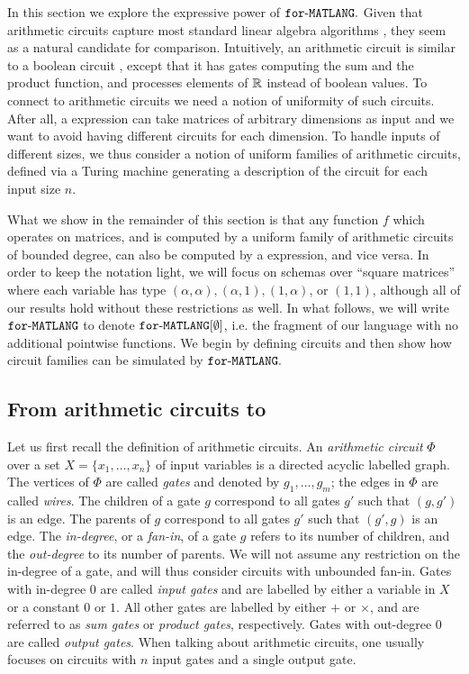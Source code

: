 In this section we explore the expressive power of $\texttt{for}\text{-}\texttt{MATLANG}.$ Given that arithmetic circuits \cite{allender} capture most standard linear algebra algorithms \cite{Raz02,ShpilkaY10}, they seem as a natural candidate for comparison. Intuitively, an arithmetic circuit is similar to a boolean circuit \cite{aroraB2009}, except that it has gates computing the sum and the product function, and processes elements of $\mathbb{R}$ instead of boolean values. To connect \langfor to arithmetic circuits we need a notion of uniformity of such circuits. After all, a \langfor expression can take matrices of arbitrary dimensions as input and we want to avoid having  different circuits for each dimension. To handle inputs of different sizes, we thus consider a notion of uniform families of arithmetic circuits, defined via a Turing machine generating a description of the circuit for each input size $n$.

What we show in the remainder of this section is that any function $f$ which operates on matrices, and is computed by a uniform family of arithmetic circuits of bounded degree, can also be computed by a \langfor expression, and vice versa. In order to keep the notation light, we will focus on 
 \langfor schemas over ``square matrices'' where each variable has type $(\alpha,\alpha),(\alpha,1),(1,\alpha)$, or $(1,1)$, although all of our results hold without these restrictions as well. In what follows, we will write $\texttt{for}\text{-}\texttt{MATLANG}$ to denote $\texttt{for}\text{-}\texttt{MATLANG}[\emptyset]$, i.e. the fragment of our language with no additional pointwise functions. We begin by defining circuits and then show how circuit families can be simulated by $\texttt{for}\text{-}\texttt{MATLANG}.$

\subsection{From arithmetic circuits to \langfor}
Let us first recall the definition of arithmetic circuits. 
An \textit{arithmetic circuit} $\Phi$ over a set $X=\{x_1,\ldots,x_n\}$ of input variables is a directed
acyclic labelled graph. The vertices of $\Phi$ are called \textit{gates} and denoted by $g_1,\ldots,g_m$;
the edges in $\Phi$ are called \textit{wires}. The children of a gate $g$ correspond to all gates
$g'$ such that $(g,g')$ is an edge. The parents of $g$ correspond to all gates $g'$ 
such that $(g',g)$ is an edge. The \textit{in-degree}, or a \textit{fan-in}, of a gate $g$ refers to its number of children, and 
the \textit{out-degree} to its number of parents. We will not assume any restriction on the in-degree of a gate, and will thus consider circuits with unbounded fan-in. Gates with in-degree $0$ are called \textit{input gates}
and are labelled by either a variable in $X$ or a constant $0$ or $1$. All other gates
are labelled by either $+$ or $\times$, and are referred to as \textit{sum gates} or \textit{product gates}, respectively.
Gates with out-degree $0$ are called \textit{output gates}. When talking about arithmetic circuits, one usually focuses on circuits with $n$ input gates and a single output gate.

